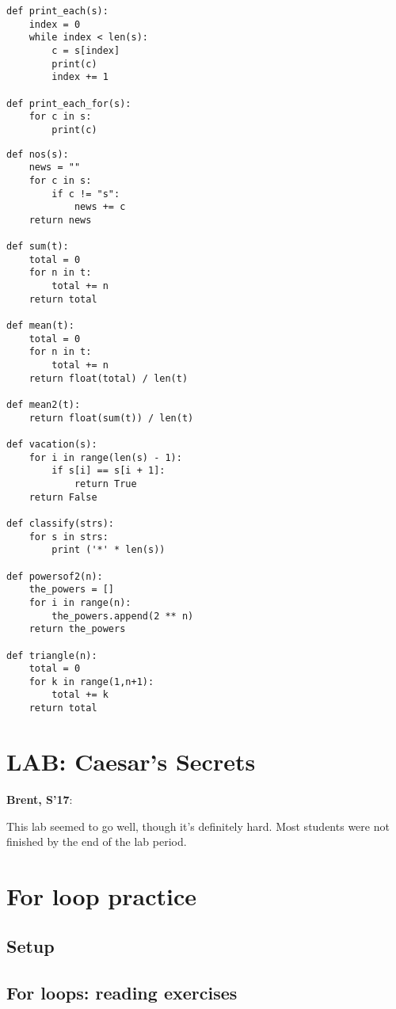 \documentclass{article}
\newenvironment{reflect}[1]
{
  \noindent
  \begin{lrbox}{\reflectbox}
    \begin{minipage}[t]{\textwidth}
      \textbf{#1}:
}{
    \end{minipage}
  \end{lrbox}
  \fbox{\usebox{\reflectbox}}
}
\begin{document}
\begin{verbatim}
def print_each(s):
    index = 0
    while index < len(s):
        c = s[index]
        print(c)
        index += 1

def print_each_for(s):
    for c in s:
        print(c)
\end{verbatim}

\begin{verbatim}
def nos(s):
    news = ""
    for c in s:
        if c != "s":
            news += c
    return news

def sum(t):
    total = 0
    for n in t:
        total += n
    return total

def mean(t):
    total = 0
    for n in t:
        total += n
    return float(total) / len(t)

def mean2(t):
    return float(sum(t)) / len(t)

def vacation(s):
    for i in range(len(s) - 1):
        if s[i] == s[i + 1]:
            return True
    return False

def classify(strs):
    for s in strs:
        print ('*' * len(s))

def powersof2(n):
    the_powers = []
    for i in range(n):
        the_powers.append(2 ** n)
    return the_powers

def triangle(n):
    total = 0
    for k in range(1,n+1):
        total += k
    return total
\end{verbatim}



\section*{LAB: Caesar's Secrets}

\begin{reflect}{Brent, S'17}
  This lab seemed to go well, though it's definitely hard.  Most
  students were not finished by the end of the lab period.
\end{reflect}

\section{For loop practice}

\subsection*{Setup}

\subsection*{For loops: reading exercises}
\end{document}
